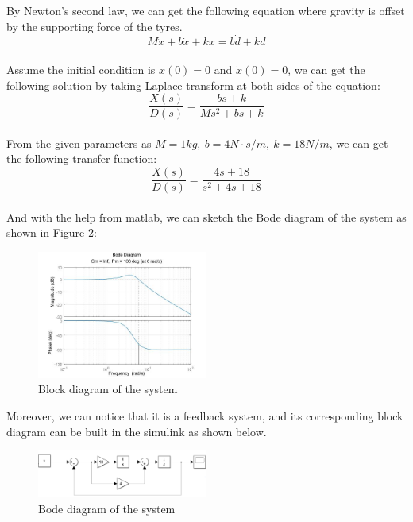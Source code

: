 \documentclass{article}
\begin{document}
By Newton's second law, we can get the following equation where gravity is offset by the supporting force of the tyres.
\begin{equation*}
    M\ddot{x}+b\dot{x}+kx=b\dot{d}+kd
\end{equation*}\\

Assume the initial condition is $x(0)=0$ and $\dot{x}(0)=0$, we can get the following solution by taking Laplace transform at both sides of the equation:
\begin{equation*}
    \frac{X(s)}{D(s)}=\frac{bs+k}{Ms^2+bs+k}
\end{equation*}\\

From the given parameters as $M=1kg,\ b=4N\cdot s/m,\ k=18N/m$, we can get the following transfer function:
\begin{equation*}
    \frac{X(s)}{D(s)}=\frac{4s+18}{s^2+4s+18}
\end{equation*}\\

And with the help from matlab, we can sketch the Bode diagram of the system as shown in Figure 2:\\

\begin{figure}[htbp]
    \centering
    \includegraphics[width=0.5\textwidth]{2.jpg}
    \caption{Block diagram of the system}
\end{figure}

Moreover, we can notice that it is a feedback system,
and its corresponding block diagram can be built in the simulink as shown below.\\

\begin{figure}[htbp]
    \centering
    \includegraphics[width=0.5\textwidth]{3.jpg}
    \caption{Bode diagram of the system}
\end{figure}
\end{document}
